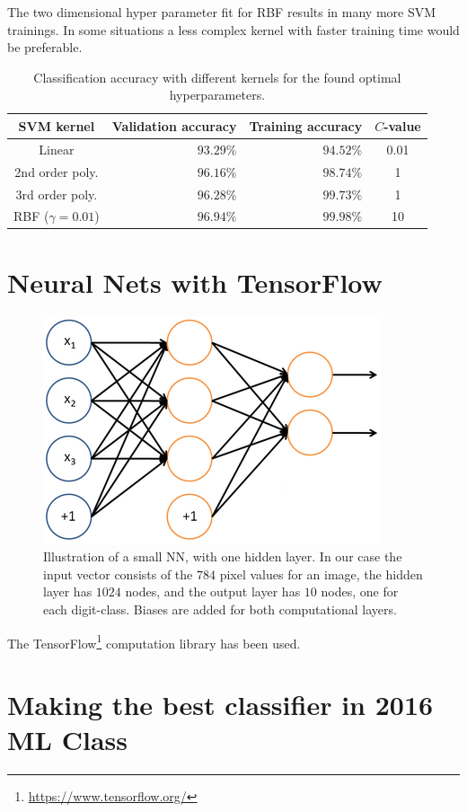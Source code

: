 \documentclass[a4paper,10pt,article,oneside,english]{memoir}
\begin{document}
The two dimensional hyper parameter fit for RBF results in many more SVM trainings. In some situations a less complex kernel with faster training time would be preferable.

\begin{table}[h!]
	\centering
	\caption{Classification accuracy with different kernels for the found optimal hyperparameters. }
	\label{tab:svm_accuracy}
	\begin{tabular}{crr S[table-format=2.4]}
		SVM kernel & Validation accuracy & Training accuracy & {$C$-value} \\ 
		\hline 
		Linear & $93.29\%$ & $94.52\%$ & 0.01 \\ 
		2nd order poly. & $96.16\%$ & $98.74\%$ & 1 \\ 
		3rd order poly. & $96.28\%$ & $99.73\%$ & 1 \\ 
		RBF ($\gamma=0.01$) & $96.94\%$ & $99.98\%$ & 10 \\ 
	\end{tabular} 
\end{table}










\chapter{Neural Nets with TensorFlow}

\begin{figure}[h!]
	\centering
	\includegraphics[width=0.4\linewidth]{nn_layout.png}
	\caption{Illustration of a small NN, with one hidden layer. In our case the input vector consists of the $784$ pixel values for an image, the hidden layer has $1024$ nodes, and the output layer has $10$ nodes, one for each digit-class. Biases are added for both computational layers.}
	\label{fig:nn_layout}
\end{figure}
The TensorFlow\footnote{\url{https://www.tensorflow.org/}} computation library has been used.

\chapter{Making the best classifier in 2016 ML Class}



	
\end{document}
